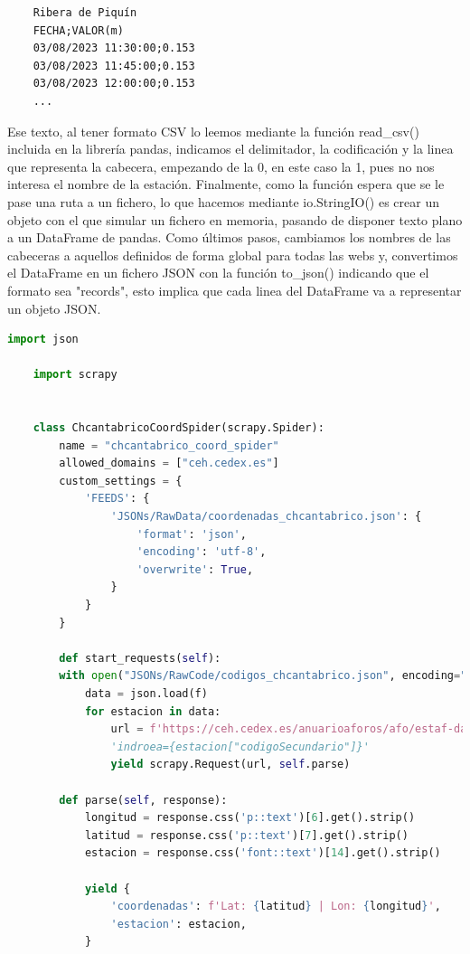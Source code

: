\begin{verbatim}
	Ribera de Piquín
	FECHA;VALOR(m)
	03/08/2023 11:30:00;0.153
	03/08/2023 11:45:00;0.153
	03/08/2023 12:00:00;0.153
	...
\end{verbatim}

Ese texto, al tener formato CSV lo leemos mediante la función read\_csv() incluida en la librería pandas, indicamos el delimitador, la codificación y la linea que representa la cabecera, empezando de la 0, en este caso la 1, pues no nos interesa el nombre de la estación. Finalmente, como la función espera que se le pase una ruta a un fichero, lo que hacemos mediante io.StringIO() es crear un objeto con el que simular un fichero en memoria, pasando de disponer texto plano a un DataFrame de pandas.\newline
\newline
Como últimos pasos, cambiamos los nombres de las cabeceras a aquellos definidos de forma global para todas las webs y, convertimos el DataFrame en un fichero JSON con la función to\_json() indicando que el formato sea "records", esto implica que cada linea del DataFrame va a representar un objeto JSON.

\begin{lstlisting}[language=Python, caption={Chcantabrico Coordinates Spider}]
	import json
	
	import scrapy
	
	
	class ChcantabricoCoordSpider(scrapy.Spider):
		name = "chcantabrico_coord_spider"
		allowed_domains = ["ceh.cedex.es"]
		custom_settings = {
			'FEEDS': {
				'JSONs/RawData/coordenadas_chcantabrico.json': {
					'format': 'json',
					'encoding': 'utf-8',
					'overwrite': True,
				}
			}
		}
		
		def start_requests(self):
		with open("JSONs/RawCode/codigos_chcantabrico.json", encoding="utf-8") as f:
			data = json.load(f)
			for estacion in data:
				url = f'https://ceh.cedex.es/anuarioaforos/afo/estaf-datos.asp?'
				'indroea={estacion["codigoSecundario"]}'
				yield scrapy.Request(url, self.parse)
		
		def parse(self, response):
			longitud = response.css('p::text')[6].get().strip()
			latitud = response.css('p::text')[7].get().strip()
			estacion = response.css('font::text')[14].get().strip()
			
			yield {
				'coordenadas': f'Lat: {latitud} | Lon: {longitud}',
				'estacion': estacion,
			}
\end{lstlisting}

